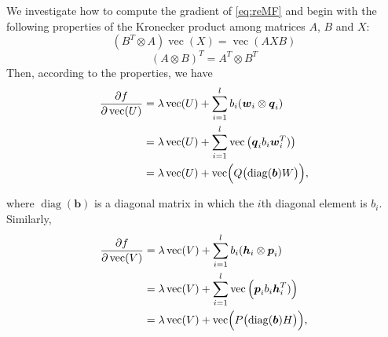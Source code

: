 \documentclass[11pt,twoside]{article}
\newcommand{\bsym}[1]{\ensuremath{\boldsymbol{#1}}}
\newcommand{\bw}{\ensuremath{\bsym{w}}}
\newcommand{\bj}{\ensuremath{\bsym{j}}}
\newcommand{\bp}{\ensuremath{\bsym{p}}}
\newcommand{\bq}{\ensuremath{\bsym{q}}}
\newcommand{\bh}{\ensuremath{\bsym{h}}}
\DeclareMathOperator*{\diag}{diag}
\DeclareMathOperator*{\vectorize}{vec}
\begin{document}
We investigate how to compute the gradient of \eqref{eq:reMF} and begin with the following properties of  the Kronecker product among matrices $A$, $B$ and $X$:
\begin{equation}
(B^T \otimes A)\vectorize(X) = \vectorize(AXB)
\label{eq:kronecker_vec}
\end{equation}
\begin{equation}
(A \otimes B)^T = A^T \otimes B^T
\label{eq:kronecker}
\end{equation}
Then, according to the properties, we have
\begin{align}
\frac{\partial f}{\partial \vectorize(U)} &=\lambda \vectorize(U) +  \sum_{i=1}^l b_i (\bw_i\otimes\bq_i)\nonumber \\
&=\lambda \vectorize(U) +  \sum_{i=1}^l \vectorize\left(\bq_i b_i \bw_i^T) \right) \nonumber\\
&=\lambda \vectorize(U) +  \vectorize \Bigl ( Q \bigl(\diag(\bsym{b}) W \bigr)  \Bigr)\label{eq:GradU},
\end{align}

where $\diag(\bsym{b})$ is a diagonal matrix in which the $i$th diagonal element is $b_i$. Similarly,
\begin{align}
\frac{\partial f}{\partial \vectorize(V)} &=\lambda \vectorize(V) +  \sum_{i=1}^l b_i (\bh_i\otimes\bp_i)\nonumber \\
&=\lambda \vectorize(V) +  \sum_{i=1}^l \vectorize\left(\bp_i b_i \bh_i^T) \right) \nonumber\\
&=\lambda \vectorize(V) +  \vectorize \Bigl ( P \bigl(\diag(\bsym{b}) H \bigr)  \Bigr)\label{eq:GradV},
\end{align}
\end{document}
